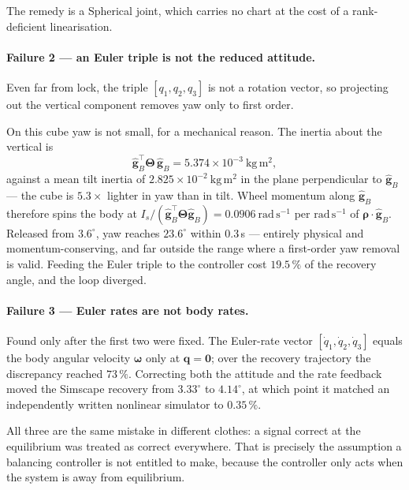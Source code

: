 The remedy is a Spherical joint, which carries no chart at the cost of a
rank-deficient linearisation.

\paragraph{Failure 2 --- an Euler triple is not the reduced attitude.} Even
far from lock, the triple $[q_1,q_2,q_3]$ is not a rotation vector, so
projecting out the vertical component removes yaw only to first order.

On this cube yaw is not small, for a mechanical reason. The inertia about the
vertical is
%
\begin{equation}
  \hat{\bm{g}}_B^{\top}\bm{\Theta}\,\hat{\bm{g}}_B
  = 5.374\times10^{-3}\ \mathrm{kg\,m^2},
\end{equation}
%
against a mean tilt inertia of $2.825\times10^{-2}\ \mathrm{kg\,m^2}$ in the
plane perpendicular to $\hat{\bm{g}}_B$ --- the cube is $5.3\times$ lighter in
yaw than in tilt. Wheel momentum along $\hat{\bm{g}}_B$ therefore spins the
body at $I_s/(\hat{\bm{g}}_B^{\top}\bm{\Theta}\hat{\bm{g}}_B)
= 0.0906\ \mathrm{rad\,s^{-1}}$ per $\mathrm{rad\,s^{-1}}$ of
$\bm{\rho}\cdot\hat{\bm{g}}_B$. Released from $3.6^\circ$, yaw reaches
$23.6^\circ$ within $0.3\,$s --- entirely physical and
momentum-conserving, and far outside the range where a first-order yaw
removal is valid. Feeding the Euler triple to the controller cost
$19.5\,\%$ of the recovery angle, and the loop diverged.

\paragraph{Failure 3 --- Euler rates are not body rates.} Found only after
the first two were fixed. The Euler-rate vector
$[\dot q_1,\dot q_2,\dot q_3]$ equals the body angular velocity $\bm{\omega}$
only at $\bm{q}=\bm{0}$; over the recovery trajectory the discrepancy reached
$73\,\%$. Correcting both the attitude and the rate feedback moved the
Simscape recovery from $3.33^\circ$ to $4.14^\circ$, at which point it
matched an independently written nonlinear simulator to $0.35\,\%$.

\medskip
\noindent
All three are the same mistake in different clothes: a signal correct at the
equilibrium was treated as correct everywhere. That is precisely the
assumption a balancing controller is not entitled to make, because the
controller only acts when the system is away from equilibrium.

